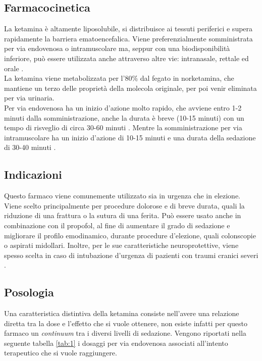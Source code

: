 \subsection*{Farmacocinetica}

La ketamina è altamente liposolubile, si distribuisce ai tessuti periferici e supera rapidamente la barriera ematoencefalica. Viene preferenzialmente somministrata per via endovenosa o intramuscolare ma, seppur con una biodisponibilità inferiore, può essere utilizzata anche attraverso altre vie: intranasale, rettale ed orale \cite{Simeupsedazione, Ketamineapplication2019}. 
\\La ketamina viene metabolizzata per l'80\% dal fegato in norketamina, che mantiene un terzo delle proprietà della molecola originale, per poi venir eliminata per via urinaria. 
\\Per via endovenosa ha un inizio d'azione molto rapido, che avviene entro 1-2 minuti dalla somministrazione, anche la durata è breve (10-15 minuti) con un tempo di risveglio di circa 30-60 minuti \cite{Uptodatepharmacology}. Mentre la somministrazione per via intramuscolare ha un inizio d'azione di 10-15 minuti e una durata della sedazione di 30-40 minuti \cite{Berkenbosch2015}.

\subsection*{Indicazioni}

Questo farmaco viene comunemente utilizzato sia in urgenza che in elezione. Viene scelto principalmente per procedure dolorose e di breve durata, quali la riduzione di una frattura o la sutura di una ferita. Può essere usato anche in combinazione con il propofol, al fine di aumentare il grado di sedazione e migliorare il profilo emodinamico, durante procedure d'elezione, quali colonscopie o aspirati midollari. Inoltre, per le sue caratteristiche neuroprotettive, viene spesso scelta in caso di intubazione d'urgenza di pazienti con traumi cranici severi \cite{Simeupsedazione}.

\subsection*{Posologia}

Una caratteristica distintiva della ketamina consiste nell'avere una relazione diretta tra la dose e l'effetto che si vuole ottenere, non esiste infatti per questo farmaco un \emph{continuum} tra i diversi livelli di sedazione. Vengono riportati nella seguente tabella \ref{tab:1} i dosaggi per via endovenosa associati all'intento terapeutico che si vuole raggiungere.

